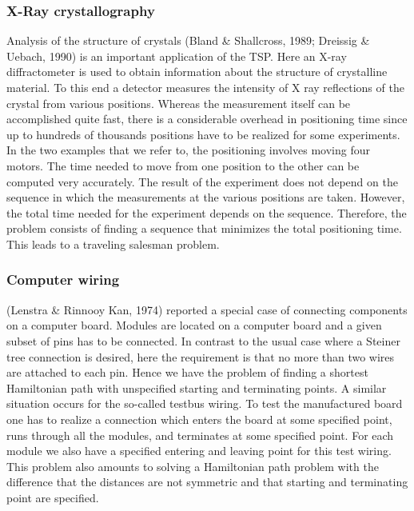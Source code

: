 \subsubsection{X-Ray crystallography}
Analysis of the structure of crystals (Bland \& Shallcross, 1989; Dreissig \& Uebach, 1990) is an important application of the TSP. Here an X-ray diffractometer is used to obtain information about the structure of crystalline material. To this end a detector measures the intensity of X ray
reflections of the crystal from various positions. Whereas the measurement itself can be accomplished quite fast, there is a considerable overhead in positioning time since up to hundreds of thousands positions have to be realized for some experiments. In the two examples that we refer to, the positioning involves moving four motors. The time needed to move from one position to the other can be computed very accurately. The result of the
experiment does not depend on the sequence in which the measurements at the various positions are taken. However, the total time needed for the experiment depends on the sequence. Therefore, the problem consists of finding a sequence that minimizes the total positioning time. This leads to a traveling salesman problem. 

\subsubsection{Computer wiring}
(Lenstra \& Rinnooy Kan, 1974) reported a special case of connecting components on a computer board. Modules are located on a computer board and a given subset of pins has to be connected. In contrast to the usual case where a Steiner tree connection is desired, here the requirement is that no more than two wires are attached to each pin. Hence we have the problem of finding a shortest Hamiltonian path with unspecified starting and terminating points. A similar situation occurs for the so-called testbus wiring. To test the manufactured board one has to realize a connection which enters the board at some specified point, runs through all the modules, and terminates at some specified point. For each module we also have a specified entering and leaving point for this test wiring. This problem also amounts to solving a Hamiltonian path problem with the difference that the distances are not symmetric and that starting and terminating point are specified.

